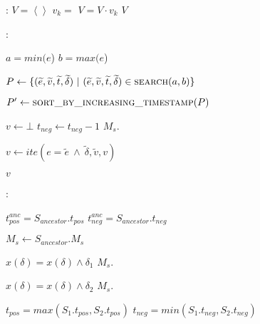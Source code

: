 \documentclass{article}
\begin{document}
\begin{algorithm}

  \begin{algorithmic}[1]
	:
		\State $V = \left\langle \right\rangle$ 
			\State $v_k = $ 
			\State $V = V \cdot v_k$
		\EndFor
		\State \Return $V$
	\EndFunction
  \end{algorithmic}

  \bigskip

  \begin{algorithmic}[1]
	:

		\State $a = min(e$)
		\State $b = max(e$)

		\State $P \leftarrow \{ (\widetilde{e}, \widetilde{v}, \widetilde{t}, \widetilde{\delta})~|~(\widetilde{e}, \widetilde{v}, \widetilde{t}, \widetilde{\delta}) \in \Call{search}{a, b}\}$

		\State $P' \leftarrow \Call{sort\_by\_increasing\_timestamp}{P}$

		\State $v \leftarrow \bot$
		\State $t_{neg} \leftarrow t_{neg} - 1$
		\State $M_s.$ 

			\State $v \leftarrow ite(e = \widetilde{e}~\wedge~\widetilde{\delta}, \widetilde{v}, v) $
		\EndFor

		\State \Return $v$
	\EndFunction
  \end{algorithmic}
  
  \bigskip

  \begin{algorithmic}[1]
	: 

		\State $t_{pos}^{anc} = S_{ancestor}.t_{pos}$ 
		\State $t_{neg}^{anc} = S_{ancestor}.t_{neg}$ 

		\State $M_s \leftarrow S_{ancestor}.M_s$
		
			\State $x(\delta) = x(\delta) \wedge \delta_1$
			\State $M_s.$
		\EndFor
		
			\State $x(\delta) = x(\delta) \wedge \delta_2$
			\State $M_s.$
		\EndFor

		\State $t_{pos} = max(S_1.t_{pos}, S_2.t_{pos})$ 
		\State $t_{neg} = min(S_1.t_{neg}, S_2.t_{neg})$ 

	\EndFunction
  \end{algorithmic}

\end{algorithm}
\end{document}
